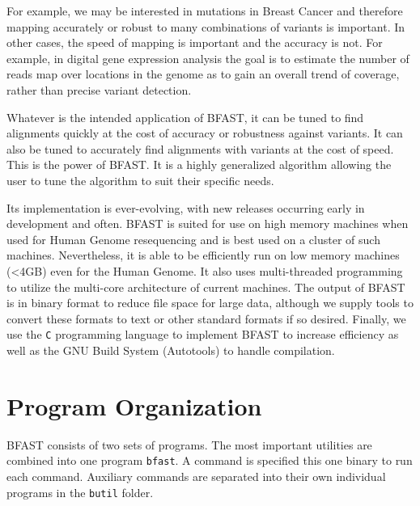 \documentclass[a4paper,12pt]{book}
\newcommand{\TT}[1]{{\tt #1}} %
\begin{document}
For example, we may be interested in mutations in Breast Cancer and therefore mapping accurately or robust to many combinations of variants is important.
In other cases, the speed of mapping is important and the accuracy is not. 
For example, in digital gene expression analysis the goal is to estimate the number of reads map over locations in the genome as to gain an overall trend of coverage, rather than precise variant detection.

Whatever is the intended application of BFAST, it can be tuned to find alignments quickly at the cost of accuracy or robustness against variants.
It can also be tuned to accurately find alignments with variants at the cost of speed. 
This is the power of BFAST.
It is a highly generalized algorithm allowing the user to tune the algorithm to suit their specific needs.

Its implementation is ever-evolving, with new releases occurring early in development and often. 
BFAST is suited for use on high memory machines when used for Human Genome resequencing and is best used on a cluster of such machines.
Nevertheless, it is able to be efficiently run on low memory machines (<4GB) even for the Human Genome.
It also uses multi-threaded programming to utilize the multi-core architecture of current machines.
The output of BFAST is in binary format to reduce file space for large data, although we supply tools to convert these formats to text or other standard formats if so desired.
Finally, we use the \TT{C} programming language to implement BFAST to increase efficiency as well as the GNU Build System (Autotools) to handle compilation.

\section{Program Organization}
BFAST consists of two sets of programs.
The most important utilities are combined into one program \TT{bfast}.  
A command is specified this one binary to run each command.
Auxiliary commands are separated into their own individual programs in the \TT{butil} folder.
\end{document}
